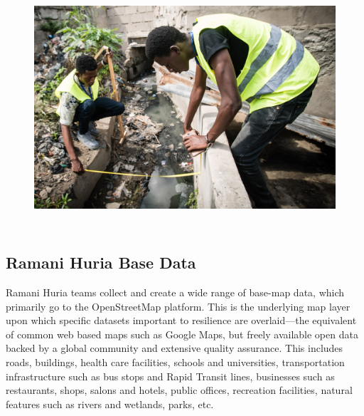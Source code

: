 \documentclass[a4paper,12pt,twoside]{article}
\begin{document}

\begin{figure}[h!]
	\centering
	\includegraphics[width=\textwidth, height=9cm,keepaspectratio]{images/Drainage_fieldwork.JPG}
\end{figure}

\subsection{Ramani Huria Base Data}
\begin{multicols}{2}
Ramani Huria teams collect and create a wide range of base-map data, which primarily go to the OpenStreetMap platform. This is the underlying map layer upon which specific datasets important to resilience are overlaid—the equivalent of common web based maps such as Google Maps, but freely available open data backed by a global community and extensive quality assurance. This includes roads, buildings, health care facilities, schools and universities, transportation infrastructure such as bus stops and Rapid Transit lines, businesses such as restaurants, shops, salons and hotels, public offices, recreation facilities, natural features such as rivers and wetlands, parks, etc. 


\end{multicols}
\end{document}
\end{multicols}
\end{document}
